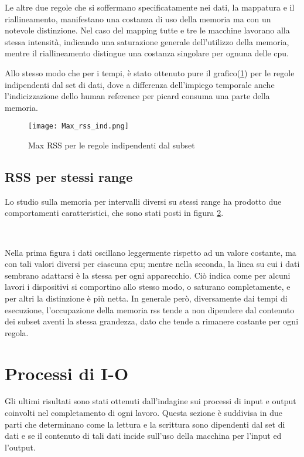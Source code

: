 Le altre due regole che si soffermano specificatamente nei dati, la mappatura e il riallineamento, manifestano una costanza di uso della memoria ma con un notevole distinzione.
Nel caso del mapping tutte e tre le macchine lavorano alla stessa intensità, indicando una saturazione generale dell'utilizzo della memoria, mentre il riallineamento distingue una costanza singolare per ognuna delle cpu. 

Allo stesso modo che per i tempi, è stato ottenuto pure il grafico(\ref{fig:RSSind}) per le regole indipendenti dal set di dati, dove a differenza dell'impiego temporale anche l'indicizzazione dello human reference per picard consuma una parte della memoria.

\begin{figure}[H]
\centering
\texttt{[image: Max\_rss\_ind.png]}
\caption{Max RSS per le regole indipendenti dal subset}
\label{fig:RSSind}
\end{figure}

\subsection{RSS per stessi range}
Lo studio sulla memoria per intervalli diversi su stessi range ha prodotto due comportamenti caratteristici, che sono stati posti in figura \ref{fig:RSSrng}.
\begin{figure}[H]
\centering
{} \quad
{} \\
\caption{}
\label{fig:RSSrng}
\end{figure}

Nella prima figura i dati oscillano leggermente rispetto ad un valore costante, ma con tali valori diversi per ciascuna cpu; mentre nella seconda, la linea su cui i dati sembrano adattarsi è la stessa per ogni apparecchio.
Ciò indica come per alcuni lavori i dispositivi si comportino allo stesso modo, o saturano completamente, e per altri la distinzione è più netta. 
In generale però, diversamente dai tempi di esecuzione, l'occupazione della memoria rss tende a non dipendere dal contenuto dei subset aventi la stessa grandezza, dato che tende a rimanere costante per ogni regola.

\section{Processi di I-O} 
Gli ultimi risultati sono stati ottenuti dall'indagine sui processi di input e output coinvolti nel completamento di ogni lavoro.
Questa sezione è suddivisa in due parti che determinano come la lettura e la scrittura sono dipendenti dal set di dati e se il contenuto di tali dati incide sull'uso della macchina per l'input ed l'output.


